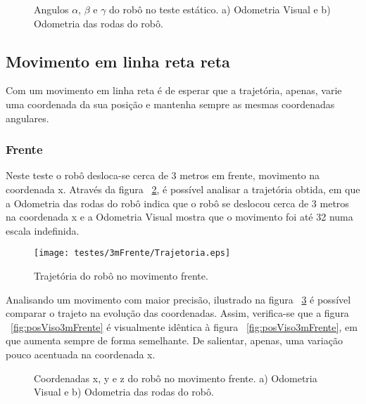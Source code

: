 \begin{figure}[!htbp]
	\centering
	\qquad
	\caption{Angulos $\alpha$, $\beta$ e $\gamma$ do robô no teste estático. a) Odometria Visual e b) Odometria das rodas do robô.}
	\label{fig:angEst}
\end{figure}


\FloatBarrier
\subsection{Movimento em linha reta reta}\label{subsubsection:Linha}

Com um movimento em linha reta é de esperar que a trajetória, apenas, varie uma coordenada da sua posição e mantenha sempre as mesmas coordenadas angulares.

\FloatBarrier
\subsubsection{Frente}\label{subsubsection:EmFrente}

Neste teste o robô desloca-se cerca de 3 metros em frente, movimento na coordenada x. 
Através da  figura ~\ref{fig:trajRobo3mFrente}, é possível analisar a trajetória obtida, em que  a Odometria das rodas do robô indica que o robô se deslocou cerca de 3 metros na coordenada x e a Odometria Visual mostra que o movimento foi até 32 numa escala indefinida. 

\begin{figure}[h!]
	\begin{center}
		\leavevmode		
		\texttt{[image: testes/3mFrente/Trajetoria.eps]}
		\caption{Trajetória do robô no movimento frente.}
		\label{fig:trajRobo3mFrente}
	\end{center}
\end{figure}

Analisando um movimento com maior precisão, ilustrado na figura ~\ref{fig:pos3mFrente} é possível comparar o trajeto na evolução das coordenadas. Assim, verifica-se que a figura  ~\ref{fig:posViso3mFrente} é visualmente idêntica à figura ~\ref{fig:posViso3mFrente}, em que aumenta sempre de forma semelhante. De salientar, apenas, uma variação pouco acentuada na coordenada x.


\begin{figure}[h!]
	\centering
	\qquad
	\caption{Coordenadas x, y e z do robô no movimento frente. a) Odometria Visual e b) Odometria das rodas do robô.}
	\label{fig:pos3mFrente}
\end{figure}


